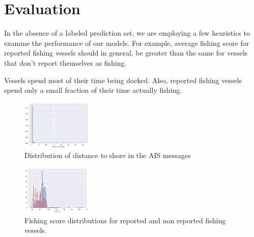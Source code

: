 \section{Evaluation}

In the absence of a labeled prediction set, we are employing a few heuristics to examine the performance of our models.
For example, average fishing score for reported fishing vessels should in general, be greater than the same for vessels that don't report themselves as fishing.

	
Vessels spend most of their time being docked. Also, reported fishing vessels spend only a small fraction of their time actually fishing.

\begin{figure}[H]
\centering
\includegraphics[width=0.3\textwidth]{images/distance_to_shore.png}
\caption{\label{fig:Distance to shore distribution}Distribution of distance to shore in the AIS messages}
\end{figure}


\begin{figure}[H]
\centering
\includegraphics[width=0.3\textwidth]{images/fishing_score_distributions.png}
\caption{\label{fig:Fishing score distribution}Fishing score distributions for reported and non reported fishing vessels.}
\end{figure}






